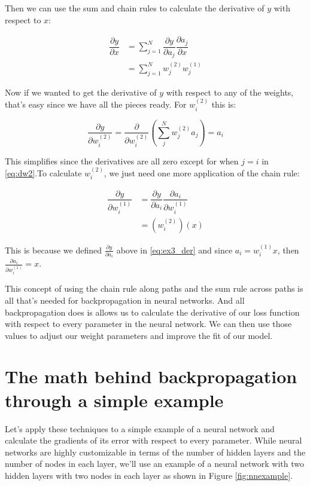\documentclass{article}
\begin{document}
Then we can use the sum and chain rules to calculate the derivative of $y$ with respect to $x$:

\begin{align}
    \dfrac{\partial y}{\partial x} &= \sum\limits_{j=1}^N  \dfrac{\partial y}{\partial a_j} \dfrac{\partial a_j}{\partial x} \label{eq:ex3_der}\\
    &= \sum\limits_{j=1}^N w_j^{(2)} w_j^{(1)}
\end{align}

Now if we wanted to get the derivative of $y$ with respect to any of the weights, that's easy since we have all the pieces ready. For $w_i^{(2)}$ this is:

\begin{equation}
    \dfrac{\partial y}{\partial w_i^{(2)}} = \dfrac{\partial}{\partial w_i^{(2)}}  (\sum\limits_j^N w_j^{(2)} a_j) = a_i
    \label{eq:dw2}
\end{equation}

This simplifies since the derivatives are all zero except for when $j=i$ in \ref{eq:dw2}.To calculate $w_i^{(2)}$, we just need one more application of the chain rule:

\begin{align}
    \dfrac{\partial y}{\partial w_i^{(1)}} &= \dfrac{\partial y}{\partial a_i} \dfrac{\partial a_i}{\partial w_i^{(1)}} \\
    &= (w_i^{(2)})(x)
\end{align}

This is because we defined $\frac{\partial y}{\partial a_i}$ above in \ref{eq:ex3_der} and since $a_i = w_i^{(1)} x$, then $\frac{\partial a_i}{\partial w_i^{(1)}} = x$.

This concept of using the chain rule along paths and the sum rule across paths is all that's needed for backpropagation in neural networks. And all backpropagation does is allows us to calculate the derivative of our loss function with respect to every parameter in the neural network. We can then use those values to adjust our weight parameters and improve the fit of our model.

\section{The math behind backpropagation through a simple example}

Let's apply these techniques to a simple example of a neural network and calculate the gradients of its error with respect to every parameter. While neural networks are highly customizable in terms of the number of hidden layers and the number of nodes in each layer, we'll use an example of a neural network with two hidden layers with two nodes in each layer as shown in Figure \ref{fig:nnexample}.
\end{document}
